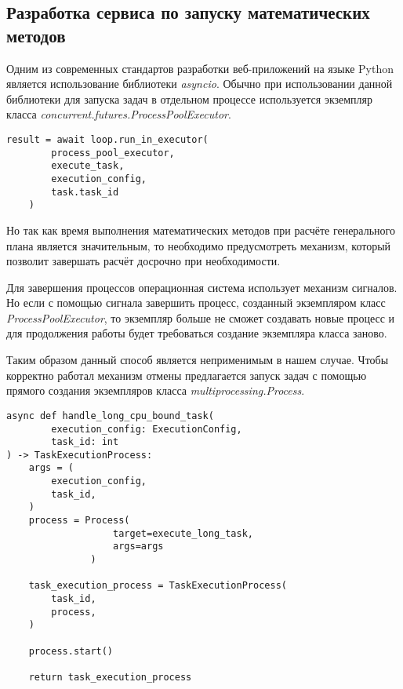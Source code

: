 \subsection{\large{Разработка сервиса по запуску математических методов}}

Одним из современных стандартов разработки веб-приложений на языке Python является использование
библиотеки \textit{asyncio}. Обычно при использовании данной библиотеки для запуска задач в отдельном процессе
используется экземпляр класса \textit{concurrent.futures.ProcessPoolExecutor}.

\begin{lstlisting}[caption={Пример запуска с использованием \textit{ProcessPoolExecutor}},captionpos=b]
    result = await loop.run_in_executor(
        process_pool_executor,
        execute_task,
        execution_config,
        task.task_id
    )
\end{lstlisting}
\vskip 8mm

Но так как время выполнения математических методов при расчёте генерального плана является значительным,
то необходимо предусмотреть механизм, который позволит завершать расчёт досрочно при необходимости.

Для завершения процессов операционная система использует механизм сигналов. Но если с помощью сигнала
завершить процесс, созданный экземпляром класс \textit{ProcessPoolExecutor}, то экземпляр больше не сможет
создавать новые процесс и для продолжения работы будет требоваться создание экземпляра класса заново.

Таким образом данный способ является неприменимым в нашем случае.
Чтобы корректно работал механизм отмены предлагается запуск задач
с помощью прямого создания экземпляров класса \textit{multiprocessing.Process}.

\begin{lstlisting}[caption={Пример запуска с использованием \textit{multiprocessing.Process}},captionpos=b]
async def handle_long_cpu_bound_task(
        execution_config: ExecutionConfig,
        task_id: int
) -> TaskExecutionProcess:
    args = (
        execution_config,
        task_id,
    )
    process = Process(
                   target=execute_long_task,
                   args=args
               )

    task_execution_process = TaskExecutionProcess(
        task_id,
        process,
    )

    process.start()

    return task_execution_process
\end{lstlisting}
